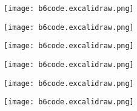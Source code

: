 \documentclass[a4paper]{scrartcl}
\begin{document}
\begin{figure}[b]
	\centering
	\begin{subfigure}{.5\textwidth}
		\centering
		\texttt{[image: b6code.excalidraw.png]}
    \vspace{15mm}
	\end{subfigure}%
	\begin{subfigure}{.5\textwidth}
		\centering
		\texttt{[image: b6code.excalidraw.png]}
    \vspace{15mm}
	\end{subfigure}
	\begin{subfigure}{.5\textwidth}
		\centering
		\texttt{[image: b6code.excalidraw.png]}
    \vspace{15mm}
	\end{subfigure}%
	\begin{subfigure}{.5\textwidth}
		\centering
		\texttt{[image: b6code.excalidraw.png]}
    \vspace{15mm}
	\end{subfigure}
	\begin{subfigure}{.5\textwidth}
		\centering
		\texttt{[image: b6code.excalidraw.png]}
	\end{subfigure}%
	\begin{subfigure}{.5\textwidth}
		\centering
		\texttt{[image: b6code.excalidraw.png]}
	\end{subfigure}
\end{figure}
\end{document}
